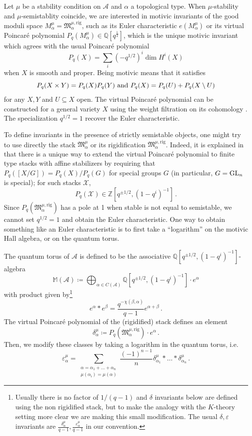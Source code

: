 \documentclass[12pt]{amsart}
\theoremstyle{definition}
\newcommand{\BM}{{\mathbb{M}}}
\newcommand{\BQ}{{\mathbb{Q}}}
\newcommand{\BZ}{{\mathbb{Z}}}
\newcommand{\CA}{{\mathcal A}}
\newcommand{\CX}{{\mathcal X}}
\newcommand{\1}{\mathbf 1}
\newcommand{\FM}{{\mathfrak{M}}}
\newcommand{\GL}{{\rm GL}}
\newcommand{\rig}{\mathrm{rig}}
\begin{document}
Let $\mu$ be a stability condition on $\CA$ and $\alpha$ a topological type. When $\mu$-stability and $\mu$-semistablity coincide, we are interested in motivic invariants of the good moduli space $M_\alpha^\mu=\FM_\alpha^{\mu, \rig}$, such as its Euler characteristic $e(M_\alpha^\mu)$ or its virtual Poincaré polynomial $P_q(M_\alpha^\mu)\in \BQ[q^{\frac{1}{2}}]$, which is the unique motivic invariant which agrees with the usual Poincaré polynomial
\[P_q(X)=\sum_{i}(-q^{1/2})^i\dim H^i(X)\]
when $X$ is smooth and proper. Being motivic means that it satisfies
\[P_q(X\times Y)=P_q(X)P_q(Y) \textup{ and }P_q(X)=P_q(U)+P_q(X\setminus U)\]
for any $X,Y$ and $U\subseteq X$ open. The virtual Poincaré polynomial can be constructed for a general variety $X$ using the weight filtration on its cohomology \cite{DKvirtualpoincare}. The specialization $q^{1/2}=1$ recover the Euler characteristic.

To define invariants in the presence of strictly semistable objects, one might try to use directly the stack $\FM_\alpha^\mu$ or its rigidification $\FM_\alpha^{\mu, \rig}$. Indeed, it is explained in \cite[Section 4.2]{JoMotivic} that there is a unique way to extend the virtual Poincaré polynomial to finite type stacks with affine stabilizers by requiring that $P_q([X/G])=P_q(X)/P_q(G)$ for special groups $G$ (in particular, $G=\GL_n$ is special); for such stacks $\CX$, 
\[P_q(\CX)\in \BZ[q^{\pm 1/2}, (1-q^i)^{-1}]\,.\]
Since $P_q(\FM_\alpha^{\mu, \rig})$ has a pole at 1 when stable is not equal to semistable, we cannot set $q^{1/2}=1$ and obtain the Euler characteristic. One way to obtain something like an Euler characteristic is to first take a ``logarithm'' on the motivic Hall algebra, or on the quantum torus. 

The quantum torus of $\CA$ is defined to be the associative $\BQ[q^{\pm 1/2}, (1-q^i)^{-1}]$-algebra
\[\BM(\CA)\coloneqq \bigoplus_{\alpha\in C(\CA)}\BQ[q^{\pm 1/2}, (1-q^i)^{-1}]\cdot e^\alpha\]
with product given by\footnote{Usually there is no factor of $1/(q-1)$ and $\delta$ invariants below are defined using the non rigidified stack, but to make the analogy with the $K$-theory setting more clear we are making this small modification. The usual $\delta, \varepsilon$ invariants are $\frac{\delta_\alpha^\mu}{q-1}, \frac{\varepsilon_\alpha^\mu}{q-1}$ in our convention.} 
\[e^\alpha\ast e^\beta=\frac{q^{-\chi(\beta, \alpha)}}{q-1}e^{\alpha+\beta}\,.\]
The virtual Poincaré polynomial of the (rigidified) stack defines an element
\[\delta_\alpha^\mu\coloneqq P_q(\FM_{\alpha}^{\mu, \rig})\cdot e^\alpha\,.\]
Then, we modify these classes by taking a logarithm in the quantum torus, i.e.
\[\varepsilon_\alpha^\mu=\sum_{\substack{\alpha=\alpha_1+\ldots+\alpha_n\\\mu(\alpha_i)=\mu(\alpha)}}\frac{(-1)^{n-1}}{n}\delta_{\alpha_1}^\mu\ast\ldots\ast \delta_{\alpha_n}^\mu\,.\]
\end{document}
